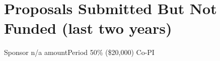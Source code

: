 
    \section*{Proposals Submitted But Not Funded (last two years)}
    \label{sec:notfunded}
        \begin{grants}
        
            {Sponsor}
            {n/a}
            {amount}{Period}
            {50\% (\$20,000)}
            {Co-PI}

        \end{grants}

